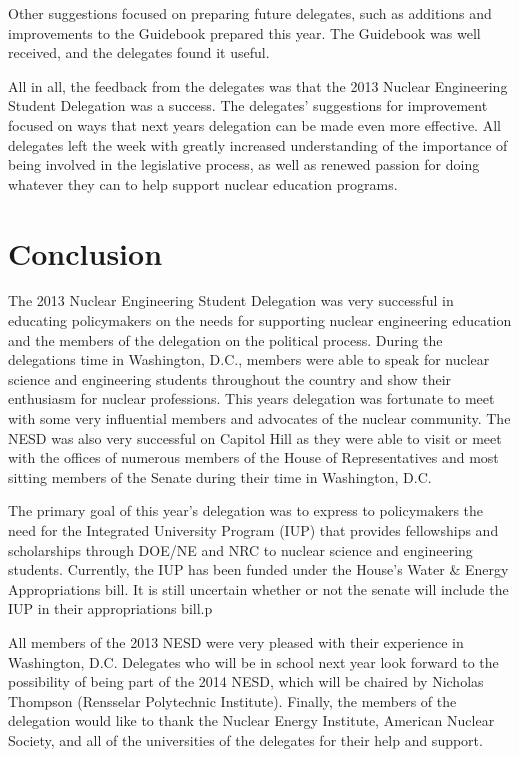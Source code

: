 \documentclass[12pt]{article}
\begin{document}
\begin{doublespace}
Other suggestions focused on preparing future delegates, such as additions and
improvements to the Guidebook prepared this year.  The Guidebook was well
received, and the delegates found it useful.

All in all, the feedback from the delegates was that the 2013 Nuclear
Engineering Student Delegation was a success.  The delegates’ suggestions for
improvement focused on ways that next years delegation can be made even more
effective.  All delegates left the week with greatly increased understanding of
the importance of being involved in the legislative process, as well as renewed
passion for doing whatever they can to help support nuclear education programs.

\newpage
\section{Conclusion}

The 2013 Nuclear Engineering Student Delegation was very successful in educating
policymakers on the needs for supporting nuclear engineering education and the
members of the delegation on the political process. During the delegations time
in Washington, D.C., members were able to speak for nuclear science and
engineering students throughout the country and show their enthusiasm for
nuclear professions. This years delegation was fortunate to meet with some very
influential members and advocates of the nuclear community. The NESD was also
very successful on Capitol Hill as they were able to visit or meet with the
offices of numerous members of the House of Representatives and most sitting
members of the Senate during their time in Washington, D.C.

The primary goal of this year’s delegation was to express to policymakers the
need for the Integrated University Program (IUP) that provides fellowships and
scholarships through DOE/NE and NRC to nuclear science and engineering
students. Currently, the IUP has been funded under the House's Water \& Energy
Appropriations bill. It is still uncertain whether or not the senate will
include the IUP in their appropriations bill.p

All members of the 2013 NESD were very pleased with their experience in
Washington, D.C. Delegates who will be in school next year look forward to the
possibility of being part of the 2014 NESD, which will be chaired by Nicholas
Thompson (Rensselar Polytechnic Institute). Finally, the members of the
delegation would like to thank the Nuclear Energy Institute, American Nuclear
Society, and all of the universities of the delegates for their help and
support.

\end{doublespace}
\end{document}
